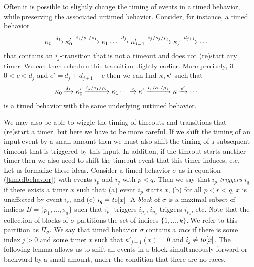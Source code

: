 Often it is possible to slightly change the timing of events in a timed behavior, 
while preserving the associated untimed behavior.
Consider, for instance, a timed behavior 
\[
\kappa_0 \xrightarrow{d_1} \kappa'_0 \xrightarrow{i_1/o_1/\rho_1} \kappa_1 \cdots
\xrightarrow{d_j} \kappa'_{j-1} \xrightarrow{i_j/o_j/\rho_j} \kappa_j  \xrightarrow{d_{j+1}} \cdots
\]
that contains an $i_j$-transition that is not a timeout and does not (re)start any timer.
We can then schedule this transition slightly earlier.
More precisely, if $0 < e < d_j$ and $e' = d_j + d_{j+1}- e $ then we can find $\kappa, \kappa'$ such that
\[
\kappa_0 \xrightarrow{d_1} \kappa'_0 \xrightarrow{i_1/o_1/\rho_1} \kappa_1 \cdots
\xrightarrow{e} \kappa' \xrightarrow{i_j/o_j/\rho_j} \kappa  \xrightarrow{e'} \cdots
\]
is a timed behavior with the same underlying untimed behavior.

We may also be able to wiggle the timing of timeouts and transitions that (re)start a timer,
but here we have to be more careful.
If we shift the timing of an input event by a small amount then we must also shift the timing of a subsequent timeout
that is triggered by this input.
In addition, if the timeout starts another timer then we also need to shift the timeout event that this timer induces, etc.
%
Let us formalize these ideas. Consider a timed behavior $\sigma$ as in equation (\ref{timedbehavior})
with events $i_p$ and $i_q$ with $p < q$.
Then we say that $i_p$ \emph{triggers} $i_q$ if there exists a timer $x$ such that:
(a) event $i_p$ starts $x$, 
(b) for all $p < r < q$, $x$ is unaffected by event $i_r$, and
(c) $i_q = \mathit{to}[x]$.
A \emph{block} of $\sigma$ is a maximal subset of indices $B = \{ p_1 ,\ldots, p_u \}$ such that $i_{p_1}$ triggers $i_{p_2}$, $i_{p_2}$ triggers $i_{p_3}$, etc.
Note that the collection of blocks of $\sigma$ partitions the set of indices $\{ 1 ,\ldots, k \}$.
We refer to this partition as $\Pi_{\sigma}$.
We say that timed behavior $\sigma$ contains a \emph{race} if there is some index $j>0$ and some timer $x$  
such that $\kappa'_{j-1}(x) = 0$ and $i_j \neq \mathit{to}[x]$.
The following lemma allows us to shift all events in a block simultaneously forward or backward by a small amount, 
under the condition that there are no races.

